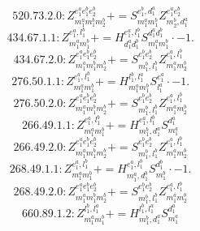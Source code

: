 \documentclass[letterpaper,10pt,fleqn,leqno,onecolumn]{article}
\begin{document}
\begin{equation} \;\;\;\;\;\;  520.73.2.0: Z^{e_{1}^{a}e_{1}^{b}e_{2}^{b}}_{m_{1}^{a}m_{1}^{b}m_{2}^{b}}+=S^{e_{1}^{b},d_{1}^{a}}_{m_{1}^{a}m_{1}^{b}}Z^{e_{1}^{a}e_{2}^{b}}_{m_{2}^{b},d_{1}^{a}} \end{equation}
\begin{equation} \;\;\;\;\;\;  434.67.1.1: Z^{e_{1}^{a},l_{1}^{b}}_{m_{1}^{a}m_{1}^{b}}+=H^{e_{1}^{a},l_{1}^{b}}_{d_{1}^{a}d_{1}^{b}}S^{d_{1}^{a}d_{1}^{b}}_{m_{1}^{a}m_{1}^{b}}\cdot -1. \end{equation}
\begin{equation} \;\;\;\;\;\;  434.67.2.0: Z^{e_{1}^{a}e_{1}^{b}e_{2}^{b}}_{m_{1}^{a}m_{1}^{b}m_{2}^{b}}+=S^{e_{1}^{b}e_{2}^{b}}_{m_{1}^{b},l_{1}^{b}}Z^{e_{1}^{a},l_{1}^{b}}_{m_{1}^{a}m_{2}^{b}} \end{equation}
\begin{equation} \;\;\;\;\;\;  276.50.1.1: Z^{e_{1}^{a},l_{1}^{b}}_{m_{1}^{a}m_{1}^{b}}+=H^{l_{1}^{b},l_{1}^{a}}_{m_{1}^{a}m_{1}^{b}}S^{e_{1}^{a}}_{l_{1}^{a}}\cdot -1. \end{equation}
\begin{equation} \;\;\;\;\;\;  276.50.2.0: Z^{e_{1}^{a}e_{1}^{b}e_{2}^{b}}_{m_{1}^{a}m_{1}^{b}m_{2}^{b}}+=S^{e_{1}^{b}e_{2}^{b}}_{m_{1}^{b},l_{1}^{b}}Z^{e_{1}^{a},l_{1}^{b}}_{m_{1}^{a}m_{2}^{b}} \end{equation}
\begin{equation} \;\;\;\;\;\;  266.49.1.1: Z^{e_{1}^{a},l_{1}^{b}}_{m_{1}^{a}m_{1}^{b}}+=H^{e_{1}^{a},l_{1}^{b}}_{m_{1}^{b},d_{1}^{a}}S^{d_{1}^{a}}_{m_{1}^{a}} \end{equation}
\begin{equation} \;\;\;\;\;\;  266.49.2.0: Z^{e_{1}^{a}e_{1}^{b}e_{2}^{b}}_{m_{1}^{a}m_{1}^{b}m_{2}^{b}}+=S^{e_{1}^{b}e_{2}^{b}}_{m_{1}^{b},l_{1}^{b}}Z^{e_{1}^{a},l_{1}^{b}}_{m_{1}^{a}m_{2}^{b}} \end{equation}
\begin{equation} \;\;\;\;\;\;  268.49.1.1: Z^{e_{1}^{a},l_{1}^{b}}_{m_{1}^{a}m_{1}^{b}}+=H^{e_{1}^{a},l_{1}^{b}}_{m_{1}^{a},d_{1}^{b}}S^{d_{1}^{b}}_{m_{1}^{b}}\cdot -1. \end{equation}
\begin{equation} \;\;\;\;\;\;  268.49.2.0: Z^{e_{1}^{a}e_{1}^{b}e_{2}^{b}}_{m_{1}^{a}m_{1}^{b}m_{2}^{b}}+=S^{e_{1}^{b}e_{2}^{b}}_{m_{1}^{b},l_{1}^{b}}Z^{e_{1}^{a},l_{1}^{b}}_{m_{1}^{a}m_{2}^{b}} \end{equation}
\begin{equation} \;\;\;\;\;\;  660.89.1.2: Z^{l_{1}^{b},l_{1}^{a}}_{m_{1}^{a}m_{1}^{b}}+=H^{l_{1}^{b},l_{1}^{a}}_{m_{1}^{b},d_{1}^{a}}S^{d_{1}^{a}}_{m_{1}^{a}} \end{equation}
\end{document}
